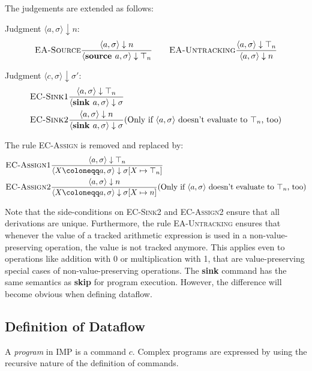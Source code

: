The judgements are extended as follows:

Judgment $\langle a, \sigma \rangle \downarrow n$:
\begin{align*}
    \textsc{EA-Source}\frac{\displaystyle \langle a, \sigma \rangle \downarrow n}{\displaystyle \langle \textbf{source }a, \sigma \rangle \downarrow \top_n}
    \qquad     
    \textsc{EA-Untracking}\frac{\displaystyle \langle a, \sigma \rangle \downarrow \top_n}{\displaystyle \langle a, \sigma \rangle \downarrow n}
\end{align*}




Judgment $\langle c, \sigma \rangle \downarrow \sigma'$:
\begin{align*}
    &\textsc{EC-Sink1}\frac{\displaystyle \langle a, \sigma \rangle\downarrow \top_n}{\displaystyle \langle \textbf{sink } a, \sigma \rangle \downarrow \sigma}\\
    &\textsc{EC-Sink2}\frac{\displaystyle \langle a, \sigma\rangle \downarrow n}{\displaystyle \langle \textbf{sink } a, \sigma \rangle \downarrow \sigma}
    (\text{Only if $\langle a, \sigma\rangle$ doesn't evaluate to $\top_n$, too})
\end{align*}

The rule \textsc{EC-Assign} is removed and replaced by:
\begin{align*}
    &\textsc{EC-Assign1}\ddfrac{\langle a, \sigma\rangle \downarrow \top_n}
    {\langle X \coloneqq a, \sigma \rangle \downarrow \sigma[X \mapsto \top_n]}\\
    &\textsc{EC-Assign2}\ddfrac{\langle a, \sigma \rangle \downarrow n}
    {\langle X \coloneqq a, \sigma \rangle \downarrow \sigma[X \mapsto n]}
     (\text{Only if $\langle a, \sigma\rangle$ doesn't evaluate to $\top_n$, too})
\end{align*}

Note that the side-conditions on \textsc{EC-Sink2} and \textsc{EC-Assign2}
ensure that all derivations are unique.
Furthermore, the rule \textsc{EA-Untracking} ensures that whenever the value of
a tracked arithmetic expression is used in a non-value-preserving operation,
the value is not tracked anymore.
This applies even to operations like addition with 0 or multiplication with 1,
that are value-preserving special cases of non-value-preserving operations.
The \textbf{sink} command has the same semantics as \textbf{skip} 
for program execution.
However, the difference will become obvious when defining dataflow.

\subsection{Definition of Dataflow}
A \emph{program} in IMP is a command $c$.
Complex programs are expressed by using the recursive nature of
the definition of commands.

